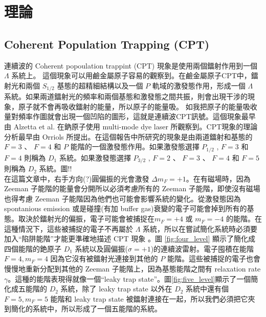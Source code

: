 \documentclass[11pt,a4paper]{article}
\begin{document}

\section{理論}
\subsection{Coherent Population Trapping (CPT)}
連續波的 Coherent popoulation trappint (CPT) 現象是使用兩個鐳射作用到一個 $\Lambda$ 系統上。 這個現象可以用鹼金屬原子容易的觀察到。在鹼金屬原子CPT中，鐳射光和兩個 $S_{1/2}$ 基態的超精細結構以及一個 $P$ 軌域的激發態作用，形成一個 $\Lambda$ 系統。如果兩道鐳射光的頻率和兩個基態和激發態之間共振，則會出現干涉的現象，原子就不會再吸收鐳射的能量，所以原子的能量吸。 如我把原子的能量吸收量對頻率作圖就會出現一個凹陷的圖形，這就是連續波CPT訊號。這個現象最早由 Alzetta et al. 在鈉原子使用 multi-mode dye laser\cite{Alzetta1976} 所觀察到。CPT現象的理論分析最早由 Orriols \cite{Orriols1979} 所提出。在這個報告中所研究的現象是由兩道鐳射和基態的 $F=3$ 、 $F=4$ 和 $P$ 能階的一個激發態作用。如果激發態選擇 $P_{1/2}$ , $F=3$ 和 $F=4$ 則稱為 $D_1$ 系統。如果激發態選擇 $P_{3/2}$ , $F=2$ 、 $F=3$ 、 $F=4$ 和 $F=5$ 則稱為 $D_2$ 系統。圖!!\\

在這篇文章中，右手方向(?)圓偏振的光會激發 $\Delta m_F = +1$。在有磁場時，因為 Zeeman 子能階的能量會分開所以必須考慮所有的 Zeeman 子能階，即使沒有磁場也得考慮 Zeeman 子能階因為他們也可能會影響系統的變化。從激發態因為 spontanious emission 或是碰撞(有加 buffer gas)衰變的電子可能會掉到所有的基態。取決於鐳射光的偏振，電子可能會被捕捉在$m_F = +4$ 或 $m_F = -4$ 的能階。在這種情況下，這些被捕捉的電子不再屬於 $\Lambda$ 系統，所以在嘗試簡化系統時必須要加入``陷阱能階''才能更準確地描述 CPT 現象\cite{Vanier1998}
。圖 \ref{fig:four_level} 顯示了簡化成四個能階的銫原子 $D_1$ 系統以及圓偏振($\sigma = +1$)的連續波雷射。電子囤積在能階 $F=4,m_F=4$ 因為它沒有被鐳射光連接到其他的 $P$ 能階。這些被捕捉的電子也會慢慢地重新分配到其他的 Zeeman 子能階上，因為基態能階之間有 relaxation rate $\gamma$。這種的能階表現得就像一個``leaky trap state''。圖\ref{fig:five_level}顯示了一個簡化成五能階的 $D_2$ 系統，除了 leaky trap state 以外在 $D_2$ 系統中還有個 $F=5,m_F=5$ 能階和 leaky trap state 被鐳射連接在一起，所以我們必須把它夾到簡化的系統中，所以形成了一個五能階的系統。\\
\end{document}
